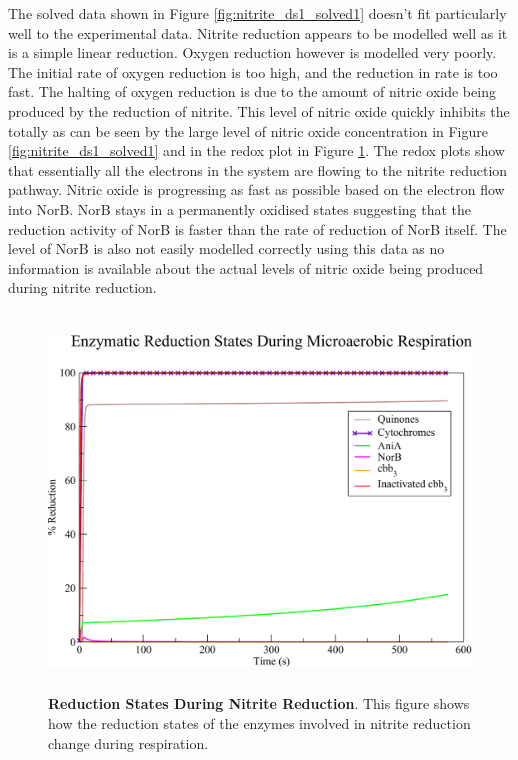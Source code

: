 The solved data shown in Figure \ref{fig:nitrite_ds1_solved1} doesn't fit particularly well to the experimental data. Nitrite reduction appears to be modelled well as it is a simple linear reduction. Oxygen reduction however is modelled very poorly. The initial rate of oxygen reduction is too high, and the reduction in rate is too fast. The halting of oxygen reduction is due to the amount of nitric oxide being produced by the reduction of nitrite. This level of nitric oxide quickly inhibits the \cbbthree{} totally as can be seen by the large level of nitric oxide concentration in Figure \ref{fig:nitrite_ds1_solved1} and in the redox plot in Figure \ref{fig:nitrite_ds1_redox1}. The redox plots show that essentially all the electrons in the system are flowing to the nitrite reduction pathway. Nitric oxide is progressing as fast as possible based on the electron flow into NorB. NorB stays in a permanently oxidised states suggesting that the reduction activity of NorB is faster than the rate of reduction of NorB itself. The level of NorB is also not easily modelled correctly using this data as no information is available about the actual levels of nitric oxide being produced during nitrite reduction.

\begin{figure}[tbp]
 \centering
 \includegraphics[height=10cm, clip=true]{./07-nitritereduction/data/dataset1redox-1.pdf}
 \caption[Reduction States During Nitrite Reduction]{{\bf Reduction States During Nitrite Reduction}. This figure shows how the reduction states of the enzymes involved in nitrite reduction change during respiration.
  \label{fig:nitrite_ds1_redox1}}
\end{figure}

